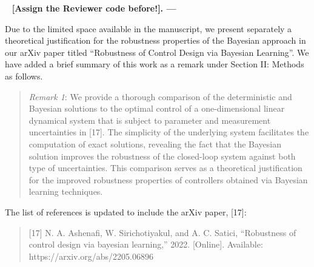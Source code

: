 \documentclass[11pt]{article}
\def \revname {[Assign the Reviewer code before!]}
\newcounter{AR_index}
\newcommand{\answer}{~\newline {\Huge\color{Gray} A.} \textbf{{\Large \revname.\arabic{AR_index}} \hspace{1mm}\----\hspace{1mm}}}
\begin{document}
\answer{ Due to the limited space available in the manuscript, we present
    separately a theoretical justification for the robustness properties of the
    Bayesian approach in our arXiv paper titled ``Robustness of Control Design
    via Bayesian Learning''. We have added a brief summary of this work as a
    remark under Section II: Methods as follows. 

    \begin{quote}
        \color{magenta}

        \textit{Remark 1}: We provide a thorough comparison of the
        deterministic and Bayesian solutions to the optimal control of a
        one-dimensional linear dynamical system that is subject to parameter and
        measurement uncertainties in [17]. 
        The simplicity of the underlying system facilitates the computation of
        exact solutions, revealing the fact that the Bayesian solution improves
        the robustness of the closed-loop system against both type of
        uncertainties.
        This comparison serves as a theoretical justification for the
        improved robustness properties of controllers obtained via Bayesian learning
        techniques.
        
        

        
    \end{quote}

    The list of references is updated to include the arXiv paper, [17]:
    \begin{quote}
        \color{magenta}
        [17] N. A. Ashenafi, W. Sirichotiyakul, and A. C. Satici, ``Robustness
        of control design via bayesian learning,'' 2022. [Online]. Available: \\
        https://arxiv.org/abs/2205.06896 
    \end{quote}

}
\end{document}
